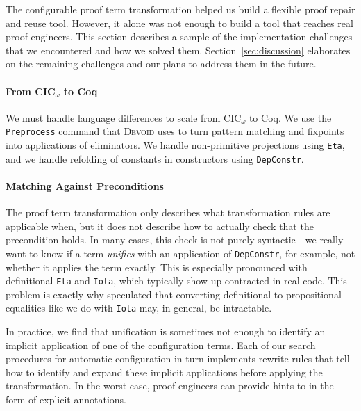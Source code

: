 The configurable proof term transformation helped us build a flexible proof repair and reuse tool.
However, it alone was not enough to build a tool that reaches real proof engineers.
This section describes a sample of the implementation challenges that we encountered and how we solved them.
Section~\ref{sec:discussion} elaborates on the remaining challenges and our plans to address them in the future.

\paragraph{From CIC$_{\omega}$ to Coq}

We must handle language differences to scale from CIC$_{\omega}$ to Coq.
We use the \lstinline{Preprocess} command that \textsc{Devoid} uses to turn pattern matching and fixpoints into applications of eliminators.
We handle non-primitive projections using \lstinline{Eta}, and we handle refolding of constants in constructors
using \lstinline{DepConstr}.

\paragraph{Matching Against Preconditions}

The proof term transformation only describes what transformation rules are applicable when,
but it does not describe how to actually check that the precondition holds.
In many cases, this check is not purely syntactic---we really want to know if a term \textit{unifies}
with an application of \lstinline{DepConstr}, for example, not whether it applies the term exactly.
This is especially pronounced with definitional \lstinline{Eta} and \lstinline{Iota},
which typically show up contracted in real code.
This problem is exactly why \citet{tabareau2019marriage} speculated that converting definitional to propositional equalities
like we do with \lstinline{Iota} may, in general, be intractable.

In practice, we find that unification is sometimes not enough to identify an implicit application of one of the configuration terms.
Each of our search procedures for automatic configuration in turn implements rewrite rules that tell \toolname
how to identify and expand these implicit applications before applying the transformation.
In the worst case, proof engineers can provide hints to \toolname in the form of explicit annotations.

